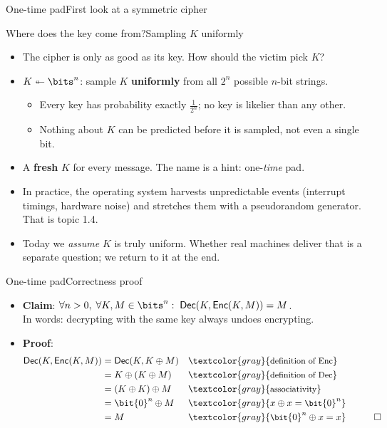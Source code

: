 \ifdefined\PRESENTATION\else\PassOptionsToClass{handout}{beamer}\fi\documentclass[aspectratio=169, lualatex]{beamer}
\begin{document}
\begin{frame}{One-time pad}{First look at a symmetric cipher}
\end{frame}

\begin{frame}{Where does the key come from?}{Sampling $K$ uniformly}
	\begin{itemize}[<+->]
		\item The cipher is only as good as its key. How should the victim pick $K$?
		\item $K \twoheadleftarrow \bits^n$: sample $K$ \textbf{uniformly} from all $2^n$ possible $n$-bit strings.
		      \begin{itemize}
			      \item Every key has probability exactly $\frac{1}{2^n}$; no key is likelier than any other.
			      \item Nothing about $K$ can be predicted before it is sampled, not even a single bit.
		      \end{itemize}
		\item A \textbf{fresh} $K$ for every message. The name is a hint: one-\emph{time} pad.
		\item In practice, the operating system harvests unpredictable events (interrupt timings, hardware noise) and stretches them with a pseudorandom generator. That is topic 1.4.
		\item Today we \emph{assume} $K$ is truly uniform. Whether real machines deliver that is a separate question; we return to it at the end.
	\end{itemize}
\end{frame}

\begin{frame}{One-time pad}{Correctness proof}
	\begin{itemize}[<+->]
		\item \textbf{Claim}: $\forall n > 0,\; \forall K, M \in \bits^{n}:\; \textsf{Dec}(K, \textsf{Enc}(K, M)) = M$.\\
		      In words: decrypting with the same key always undoes encrypting.
		\item \textbf{Proof}:
		      \begin{align*}
			      \textsf{Dec}(K, \textsf{Enc}(K, M)) & = \textsf{Dec}(K, K \oplus M) && \textcolor{gray}{\small\text{definition of Enc}} \\
			                                          & = K \oplus (K \oplus M)       && \textcolor{gray}{\small\text{definition of Dec}} \\
			                                          & = (K \oplus K) \oplus M       && \textcolor{gray}{\small\text{associativity}}     \\
			                                          & = \bit{0}^n \oplus M          && \textcolor{gray}{\small x \oplus x = \bit{0}^n}   \\
			                                          & = M                           && \textcolor{gray}{\small \bit{0}^n \oplus x = x} \quad \qed
		      \end{align*}
	\end{itemize}
\end{frame}
\end{document}
